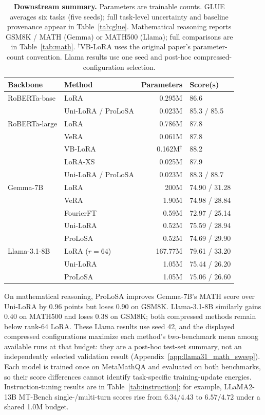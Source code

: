 \begin{table}[t]
 \centering\small
 \caption{\textbf{Downstream summary.} Parameters are trainable counts. GLUE averages six tasks (five seeds); full task-level uncertainty and baseline provenance appear in Table~\ref{tab:glue}. Mathematical reasoning reports GSM8K / MATH (Gemma) or MATH500 (Llama); full comparisons are in Table~\ref{tab:math}. $^\dagger$VB-LoRA uses the original paper's parameter-count convention. Llama results use one seed and post-hoc compressed-configuration selection.}
 \label{main:tab_performance}
 \begin{tabular}{llrl}
 \toprule
 Backbone & Method & Parameters & Score(s) \\
 \midrule
 RoBERTa-base & LoRA & 0.295M & 86.6 \\
 & Uni-LoRA / ProLoSA & 0.023M & 85.3 / 85.5 \\
 RoBERTa-large & LoRA & 0.786M & 87.8 \\
 & VeRA & 0.061M & 87.8 \\
 & VB-LoRA & 0.162M$^\dagger$ & 88.2 \\
 & LoRA-XS & 0.025M & 87.9 \\
 & Uni-LoRA / ProLoSA & 0.023M & 88.3 / 88.7 \\
 \midrule
 Gemma-7B & LoRA & 200M & 74.90 / 31.28 \\
 & VeRA & 1.90M & 74.98 / 28.84 \\
 & FourierFT & 0.59M & 72.97 / 25.14 \\
 & Uni-LoRA & 0.52M & 75.59 / 28.94 \\
 & ProLoSA & 0.52M & 74.69 / 29.90 \\
 Llama-3.1-8B & LoRA ($r=64$) & 167.77M & 79.61 / 33.20 \\
 & Uni-LoRA & 1.05M & 75.44 / 26.20 \\
 & ProLoSA & 1.05M & 75.06 / 26.60 \\
 \bottomrule
 \end{tabular}
\end{table}

On mathematical reasoning, ProLoSA improves Gemma-7B's MATH score over Uni-LoRA by $0.96$ points but loses $0.90$ on GSM8K. Llama-3.1-8B similarly gains $0.40$ on MATH500 and loses $0.38$ on GSM8K; both compressed methods remain below rank-64 LoRA. These Llama results use seed 42, and the displayed compressed configurations maximize each method's two-benchmark mean among available runs at that budget: they are a post-hoc test-set summary, not an independently selected validation result (Appendix~\ref{app:llama31_math_sweep}). Each model is trained once on MetaMathQA and evaluated on both benchmarks, so their score differences cannot identify task-specific training-update energies. Instruction-tuning results are in Table~\ref{tab:instruction}; for example, LLaMA2-13B MT-Bench single-/multi-turn scores rise from $6.34/4.43$ to $6.57/4.72$ under a shared 1.0M budget.

